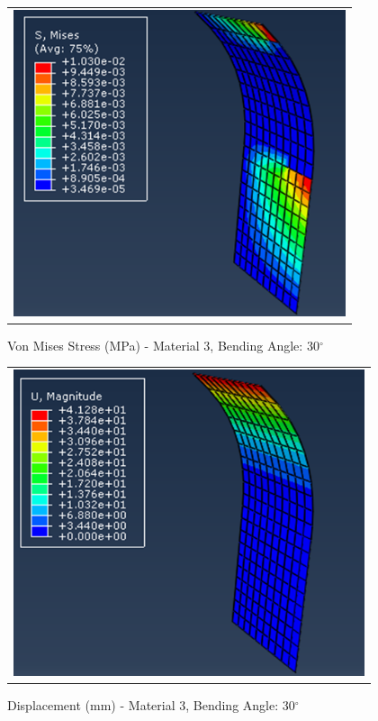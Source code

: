 \documentclass[a4paper,12pt]{article}
\numberwithin{equation}{section}
\numberwithin{figure}{section}
\begin{document}
\begin{figure}[H]
  \centering
  \begin{tabular}{@{}c@{}}
    \includegraphics[width=0.7\linewidth,height=255pt]{Results/Bending/M3_VMS_30.png} \\
  \end{tabular}
  \caption{Von Mises Stress (MPa) - Material 3,  Bending Angle: 30$^{\circ}$ }
\end{figure}

\begin{figure}[H]
  \centering
  \begin{tabular}{@{}c@{}}
    \includegraphics[width=0.7\linewidth,height=255pt]{Results/Bending/M3_DIS_30.png} \\
  \end{tabular}
  \caption{Displacement (mm) - Material 3, Bending Angle: 30$^{\circ}$ }
\end{figure}
\end{document}

